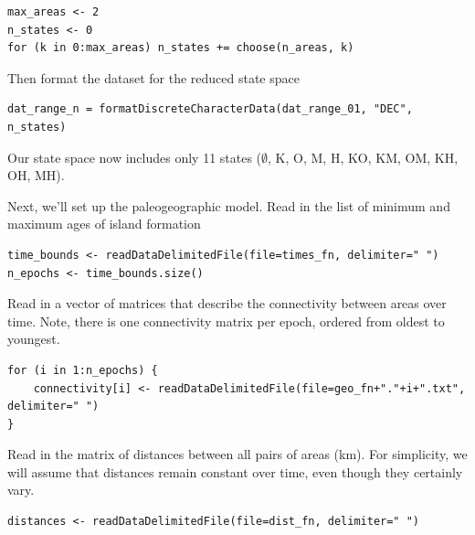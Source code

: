 \begin{snugshade}
\begin{lstlisting}
max_areas <- 2
n_states <- 0
for (k in 0:max_areas) n_states += choose(n_areas, k)
\end{lstlisting}
\end{snugshade}

Then format the dataset for the reduced state space

\begin{snugshade}
\begin{lstlisting}
dat_range_n = formatDiscreteCharacterData(dat_range_01, "DEC", n_states)
\end{lstlisting}
\end{snugshade}

Our state space now includes only 11 states ($\emptyset$, K, O, M, H, KO, KM, OM, KH, OH, MH).

Next, we'll set up the paleogeographic model.
Read in the list of minimum and maximum ages of island formation

\begin{snugshade}
\begin{lstlisting}
time_bounds <- readDataDelimitedFile(file=times_fn, delimiter=" ")
n_epochs <- time_bounds.size()
\end{lstlisting}
\end{snugshade}

Read in a vector of matrices that describe the connectivity between areas over time.
Note, there is one connectivity matrix per epoch, ordered from oldest to youngest.

\begin{snugshade}
\begin{lstlisting}
for (i in 1:n_epochs) {
    connectivity[i] <- readDataDelimitedFile(file=geo_fn+"."+i+".txt", delimiter=" ")
}
\end{lstlisting}
\end{snugshade}

Read in the matrix of distances between all pairs of areas (km). For simplicity, we will assume that distances remain constant over time, even though they certainly vary.

\begin{snugshade}
\begin{lstlisting}
distances <- readDataDelimitedFile(file=dist_fn, delimiter=" ")
\end{lstlisting}
\end{snugshade}


